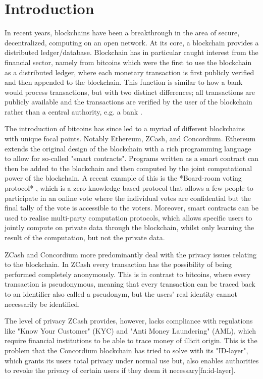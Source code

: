 \chapter{Introduction}
\label{ch:intro}

In recent years, blockchains have been a breakthrough in the area of
secure, decentralized, computing on an open network.  At its core, a blockchain
provides a distributed ledger/database. Blockchain has in particular caught
interest from the financial sector, namely from bitcoins which were the first to use
the blockchain as a distributed ledger, where each monetary transaction is first
publicly verified and then appended to the blockchain. This function
is similar to how a bank would process transactions, but with two distinct differences;
all transactions are publicly available and the transactions are verified by
the user of the blockchain rather than a central authority, e.g. a bank
\cite{blockchain-overview}.

The introduction of bitcoins has since led to a myriad of different blockchains with unique
focal points.
Notably Ethereum, ZCash, and Concordium. Ethereum extends the original design of
the blockchain with a rich programming language to allow for so-called "smart
contracts". Programs written as a smart contract can then be added to the
blockchain and then computed by the joint computational power of the blockchain.
A recent example of this is the *Board-room voting protocol*
\cite{boardroom-voting}, which is a zero-knowledge based protocol that allows a
few people to participate in an online vote where the individual votes are
confidential but the final tally of the vote is accessible to the voters.
Moreover, smart contracts can be used to realise multi-party computation protocols,
which allows specific users to jointly compute on private data through the blockchain,
whilst only learning the result of the computation, but not the private data.

ZCash and Concordium more predominantly deal with the privacy issues relating
to the blockchain.
In ZCash every transaction has the possibility of being performed completely
anonymously. This is in contrast to bitcoins, where every transaction is
pseudonymous, meaning that every transaction can be traced back to an
identifier also called a pseudonym, but
the users' real identity cannot necessarily be identified.

The level of privacy ZCash provides, however, lacks compliance
with regulations like "Know Your Customer" (KYC) and "Anti
Money Laundering" (AML), which require financial institutions to be able to trace
money of illicit origin. This is the problem that the Concordium
blockchain has tried to solve with its "ID-layer", which grants its
users total privacy under normal use but, also enables authorities to revoke the privacy of certain
users if they deem it necessary[fn:id-layer].


